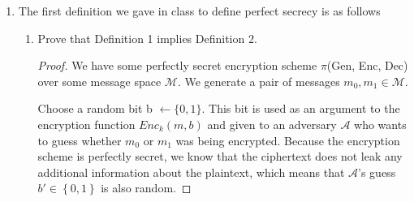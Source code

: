 \documentclass{article}
\begin{document}
\begin{enumerate}
\begin{enumerate}
\begin{proof}
        Suppose $\pi$ has a message space $\mathcal{M}$ with two messages $m_0$ and $m_1$. We are given that any message space $\mathcal{M}$ should be satisfied. Assign
        
        $Pr[M = m_0] \neq Pr[M = m_1]$ such that $Pr[M = m_0] + Pr[M = m_1] = 1$.\newline

        Now $\mathcal{M} = 
        Pr(m_0) = \alpha$,
        $Pr(m_1) = \beta$ 
        for some $\alpha, \beta \in \{0, 1\}, \alpha \neq \beta$. \newline

        By the definition of perfect secrecy,

        $Pr[M = m | C = c) = P(M = m]$\newline

        This implies that $Pr[M = m_0 | C = c] = Pr[M = m_0]$ and $Pr[M = m_1 | C = c] = Pr[M = m_1]$. We then find that $Pr[M = m_0 \mid C = c] =
          Pr[M = m_0] \neq Pr[M = m_1] = Pr[M = m_1 \mid C = c]$ by the current probability distribution. This contradicts the initial assumption that $Pr[M = m_1 | C = c] = Pr[M = m_1 \mid C = c]$
        
        \end{proof}

      \item An encryption scheme with message space M is perfectly secret if and 
        only if for every probability distribution over $\mathcal{M}$ and every
        $c_0, c_1 \in C$ 
        we have $Pr\left[C = c_0\right] = Pr\left[C = c_1\right]$.

        \textbf{FIXME}
        
    \end{enumerate}
  \item The first definition we gave in class to define perfect secrecy is as follows
    \begin{enumerate}
      \item Prove that Definition 1 implies Definition 2.

        \begin{proof}
          We have some perfectly secret encryption scheme $\pi$(Gen, Enc, Dec) over some message 
          space $\mathcal{M}$. We generate a pair of messages 
          $m_0, m_1 \in \mathcal{M}$.\newline

          Choose a random bit b $\leftarrow \{0, 1\}$. This bit is used as an argument to the encryption function $Enc_k(m, b)$ and given to an adversary $\mathcal{A}$ who wants to guess whether $m_0$ or $m_1$ was being encrypted. Because the encryption scheme is perfectly secret, we know that the ciphertext does not leak any additional information about the plaintext, which means that $\mathcal{A}$'s guess $b' \in \left\{0, 1\right\}$ is also random.\newline
          

\end{proof}
\end{enumerate}
\end{enumerate}
\end{document}

